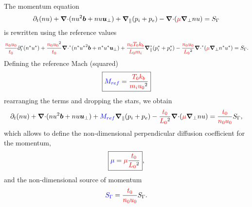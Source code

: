 \documentclass[a4paper,10pt]{article}
\newcommand{\bm}[1]{\text{\boldmath$#1$\unboldmath}}
\newcommand{\bu}{\bm{u}}
\newcommand{\Div}{{\bm{\nabla}\cdot}}
\newcommand{\Grad}{\bm{\nabla}}
\renewcommand{\b}{\bm{b}}
\newcommand{\Gradpar}{\Grad_{\parallel}}
\newcommand{\Gradper}{\Grad_{\perp}}
\newcommand{\Gm}{\Gamma}
\newcommand{\yd}[1]{{\color{red} #1\color{black}}} %
\newcommand{\nd}[1]{{\color{blue} #1\color{black}}} %
\def\Lz{\yd{L_0}}
\def\tz{\yd{t_0}}
\def\nz{\yd{n_0}}
\def\uz{\yd{u_0}}
\def\Tz{\yd{T_0}}
\def\Mref{\nd{M_{ref}}}
\def\kb{\yd{k_b}}
\def\mi{\yd{m_i}}
\def\dcon{\yd{\mu}}
\def\dcona{\nd{\mu}}
\begin{document}
The momentum equation 
\[
\partial_t (nu)  + \Div (nu^2\b + nu \bu_\bot) +  \Gradpar(p_i+p_e) - \Div (\dcon \Gradper nu) =S_{\Gm}
\]
is rewritten using the reference values
\[
\frac{\nz \uz}{\tz}\partial^*_t (n^*u^*)  + \frac{\nz \uz^2}{\tz} \Div^* (n^*{u^*}^2\b + n^*u^* \bu_\bot) + \frac{\nz \Tz \kb}{\Lz \mi} \Gradpar^* (p_i^*+p_e^*) - \frac{\nz \uz}{\Lz^2} \Div^* (\dcon \Gradper n^*u^*) =S_{\Gm}.
\]
Defining the reference Mach (squared)
\[
\boxed{
\Mref = \frac{\Tz \kb}{\mi \uz^2}
}
\]
rearranging the terms and dropping the stars, we obtain
\begin{equation}\label{eq:mome-ad}
\partial_t (nu)  + \Div (nu^2\b + nu \bu_\bot) +   \Mref \Gradpar(p_i+p_e) -\frac{\tz}{\Lz^2} \Div (\dcon \Gradper nu) =\frac{\tz}{\nz \uz}S_{\Gm},
\end{equation}
which allows to define the non-dimensional perpendicular diffusion coefficient for the momentum,
\begin{equation}
\boxed{
\dcona= \dcon \frac{\tz}{\Lz^2}
},
\end{equation}
and the non-dimensional source of momentum
\[
 \nd{S_{\Gm}} =\frac{\tz}{\nz \uz} S_{\Gm}.
\]
\end{document}
